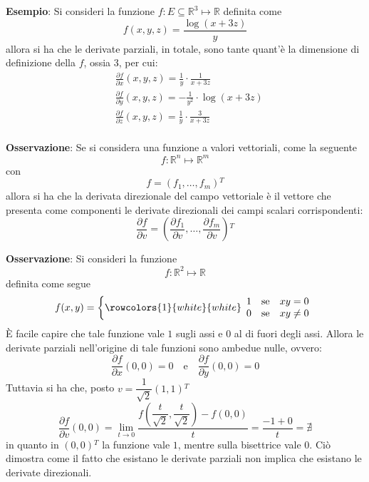 \documentclass[a4paper]{extarticle}
\begin{document}
\vspace{2em}
\noindent
\textbf{Esempio}: Si consideri la funzione $f:E \subseteq \mathbb{R}^3\longmapsto \mathbb{R}$ definita come
\[f(x,y,z) = \frac{\log(x+3z)}{y}\]
allora si ha che le derivate parziali, in totale, sono tante quant'è la dimensione di definizione della $f$, ossia $3$, per cui:
\begin{align*}
    &\frac{\partial f}{\partial x}(x,y,z) = \frac{1}{y} \cdot \frac{1}{x+3z}\\
    &\frac{\partial f}{\partial y}(x,y,z) = -\frac{1}{y^2} \cdot \log(x+3z)\\
    &\frac{\partial f}{\partial z}(x,y,z) = \frac{1}{y} \cdot \frac{3}{x+3z}\\
\end{align*}

\vspace{1em}
\noindent
\textbf{Osservazione}: Se si considera una funzione a valori vettoriali, come la seguente
\[f : \mathbb{R}^n \longmapsto \mathbb{R}^m\]
con
\[f=(f_1,\dots,f_m){^T}\]
allora si ha che la derivata direzionale del campo vettoriale è il vettore che presenta come componenti le derivate direzionali dei campi scalari corrispondenti:
\[\frac{\partial f}{\partial v} = \left(\frac{\partial f_1}{\partial v}, \dots, \frac{\partial f_m}{\partial v}\right){^T}\]

\vspace{1em}
\noindent
\textbf{Osservazione}: Si consideri la funzione
\[f:\mathbb{R}^2 \longmapsto \mathbb{R}\]
definita come segue
\[f(x,y) = \left\{
    \rowcolors{1}{white}{white}
    \begin{array}{lll}
        1 & \text{se} & xy=0\\
        0 & \text{se} & xy \neq 0\\
    \end{array}
    \right.    
\]
È facile capire che tale funzione vale $1$ sugli assi e $0$ al di fuori degli assi. Allora le derivate parziali nell'origine di tale funzioni sono ambedue nulle, ovvero:
\[\frac{\partial f}{\partial x}(0,0)=0 \hspace{1em} \text{e} \hspace{1em} \frac{\partial f}{\partial y}(0,0)=0\]
Tuttavia si ha che, posto $v=\dfrac{1}{\sqrt{2}} (1,1){^T}$
\[\frac{\partial f}{\partial v} (0,0)=\lim_{t \to 0} \dfrac{f \left(\dfrac{t}{\sqrt{2}},\dfrac{t}{\sqrt{2}}\right)-f(0,0)}{t}=\frac{-1+0}{t}= \nexists\]
in quanto in $(0,0){^T}$ la funzione vale $1$, mentre sulla bisettrice vale $0$. Ciò dimostra come il fatto che esistano le derivate parziali non implica che esistano le derivate direzionali.
\end{document}
